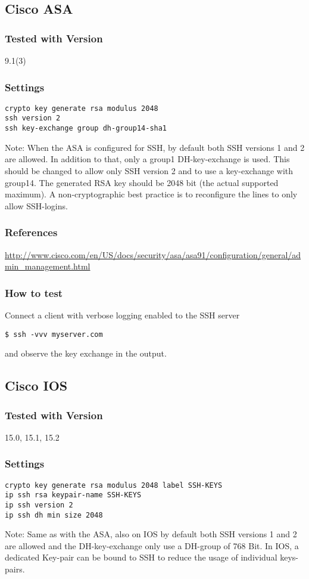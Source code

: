 \subsection{Cisco ASA}
\subsubsection{Tested with Version} 9.1(3)
\subsubsection{Settings}
\begin{lstlisting}[breaklines]
crypto key generate rsa modulus 2048
ssh version 2
ssh key-exchange group dh-group14-sha1
\end{lstlisting}
Note: When the ASA is configured for SSH, by default both SSH versions 1 and 2 are allowed. In addition to that, only a group1 DH-key-exchange is used. This should be changed to allow only SSH version 2 and to use a key-exchange with group14. The generated RSA key should be 2048 bit (the actual supported maximum). A non-cryptographic best practice is to reconfigure the lines to only allow SSH-logins.
\subsubsection{References}
\url{http://www.cisco.com/en/US/docs/security/asa/asa91/configuration/general/admin\_management.html }
\subsubsection{How to test}
Connect a client with verbose logging enabled to the SSH server \\
\begin{lstlisting}[breaklines]
$ ssh -vvv myserver.com
\end{lstlisting}and observe the key exchange in the output.


\subsection{Cisco IOS}
\subsubsection{Tested with Version} 15.0, 15.1, 15.2
\subsubsection{Settings}
\begin{lstlisting}[breaklines]
crypto key generate rsa modulus 2048 label SSH-KEYS
ip ssh rsa keypair-name SSH-KEYS
ip ssh version 2
ip ssh dh min size 2048
\end{lstlisting}
Note: Same as with the ASA, also on IOS by default both SSH versions 1 and 2 are allowed and the DH-key-exchange only use a DH-group of 768 Bit.
In IOS, a dedicated Key-pair can be bound to SSH to reduce the usage of individual keys-pairs.
